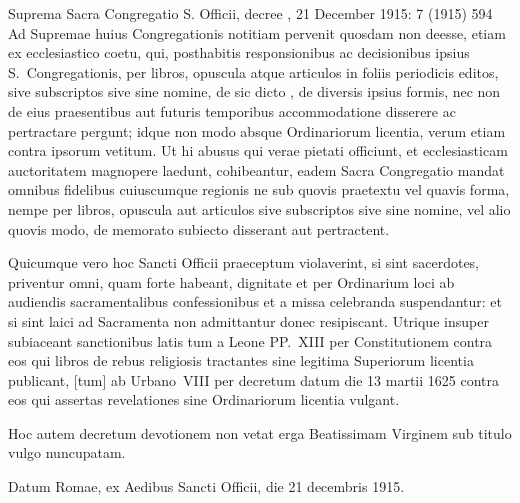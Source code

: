 \begin{operativetext}{Suprema Sacra Congregatio S. Officii, decree
, 21 December 1915:
 7 (1915) 594}
Ad Supremae huius Congregationis notitiam pervenit quosdam non
deesse, etiam ex ecclesiastico coetu, qui, posthabitis responsionibus
ac decisionibus ipsius S.~Congregationis, per libros, opuscula atque
articulos in foliis periodicis editos, sive subscriptos sive sine
nomine, de sic dicto , de diversis ipsius
formis, nec non de eius praesentibus aut futuris temporibus
accommodatione disserere ac pertractare pergunt; idque non modo
absque Ordinariorum licentia, verum etiam contra ipsorum vetitum. Ut
hi abusus qui verae pietati officiunt, et ecclesiasticam auctoritatem
magnopere laedunt, cohibeantur, eadem Sacra Congregatio mandat
omnibus fidelibus cuiuscumque regionis ne sub quovis praetextu vel
quavis forma, nempe per libros, opuscula aut articulos sive
subscriptos sive sine nomine, vel alio quovis modo, de memorato
subiecto disserant aut pertractent.\par
Quicumque vero hoc Sancti Officii praeceptum violaverint, si sint
sacerdotes, priventur omni, quam forte habeant, dignitate et per
Ordinarium loci ab audiendis sacramentalibus confessionibus et a
missa celebranda suspendantur: et si sint laici ad Sacramenta non
admittantur donec resipiscant. Utrique insuper subiaceant
sanctionibus latis tum a Leone PP.~XIII per Constitutionem
 contra eos qui libros de rebus
religiosis tractantes sine legitima Superiorum licentia publicant,
[tum] ab Urbano~VIII per decretum 
datum die 13 martii 1625 contra eos qui assertas revelationes sine
Ordinariorum licentia vulgant.\par
Hoc autem decretum devotionem non vetat erga Beatissimam Virginem
sub titulo  vulgo 
nuncupatam.\par
Datum Romae, ex Aedibus Sancti Officii, die 21 decembris
1915.
\end{operativetext}

